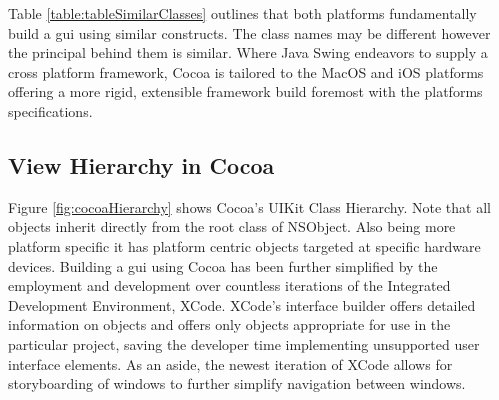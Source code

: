 \documentclass[a4paper,14pt]{article}
\begin{document}
%
%
%
%
%


Table \ref{table:tableSimilarClasses} outlines that both platforms fundamentally build a \gls{gui} using similar constructs. The class names may be different however the principal behind them is similar. Where Java Swing endeavors to supply a cross platform framework, Cocoa is tailored to the MacOS and iOS platforms offering a more rigid, extensible framework build foremost with the platforms specifications. 
\subsection{View Hierarchy in Cocoa} %
\label{sub:view_hierarchy_in_cocoa}
Figure \ref{fig:cocoaHierarchy} shows Cocoa's UIKit Class Hierarchy. Note that all objects inherit directly from the root class of NSObject. Also being more platform specific it has platform centric objects targeted at specific hardware devices. Building a \gls{gui} using Cocoa has been further simplified by the employment and development over countless iterations of the Integrated Development Environment, XCode. XCode's interface builder offers detailed information on objects and offers only objects appropriate for use in the particular project, saving the developer time implementing unsupported user interface elements. As an aside, the newest iteration of XCode allows for storyboarding of windows to further simplify navigation between windows.
\end{document}
